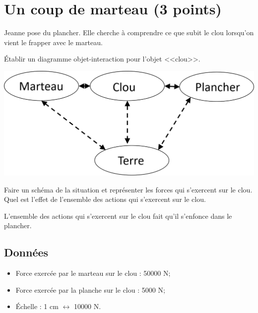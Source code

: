 \section{Un coup de marteau (3 points)}\label{marteau}

Jeanne pose du plancher. Elle cherche à comprendre ce que subit le clou lorsqu'on vient le frapper avec le marteau.

\begin{questions}
	\question \'Etablir un diagramme objet-interaction pour l'objet <<clou>>.
		\begin{solution}
			\begin{center}
				\includegraphics[scale=0.5]{doi_marteau}
			\end{center}
		\end{solution}
	\question Faire un schéma de la situation et représenter les forces qui s'exercent sur le clou.
	\question Quel est l'effet de l'ensemble des actions qui s'exercent sur le clou.
		\begin{solution}
			L'ensemble des actions qui s'exercent sur le clou fait qu'il s'enfonce dans le plancher.
		\end{solution}
	
\end{questions}

\subsection*{Données}
	\begin{itemize}
		\item Force exercée par le marteau sur le clou : \num{50000} N;
		\item Force exercée par la planche sur le clou : \num{5000} N;
		\item \'Echelle : 1 cm $\leftrightarrow$ \num{10000} N.
	\end{itemize}